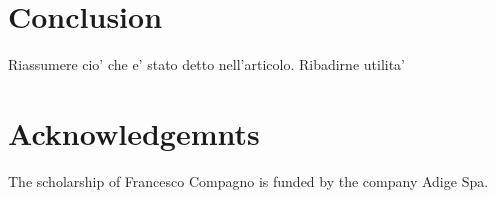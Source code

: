 \documentclass[crcready]{iosart2x}
\newcommand{\TODO}[1]{{\color{red} #1}}
\begin{document}
\section{Conclusion}\label{sec:conc}
\TODO{Riassumere cio' che e' stato detto nell'articolo. Ribadirne utilita'}





\section*{Acknowledgemnts}


The scholarship of Francesco Compagno is funded
by the company Adige Spa.





%
\end{document}

